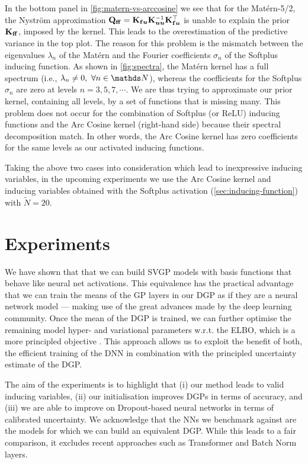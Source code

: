 In the bottom panel in \cref{fig:matern-vs-arccosine} we see that for the Mat\'ern-5/2, the Nystr\"om approximation $\mathbf{{Q}}_{\mathbf{f} \mathbf{f}} = \mathbf{{K}}_{\mathbf{f} \bm{u}} \mathbf{{K}}_{\bm{u} \bm{u}}^{-1} \mathbf{{K}}_{\mathbf{f} \bm{u}}^\top$ is unable to explain the prior $\Kff$, imposed by the kernel. This leads to the overestimation of the predictive variance in the top plot. The reason for this problem is the mismatch between the eigenvalues $\lambda_n$ of the Mat\'ern and the Fourier coefficients $\sigma_n$ of the Softplus inducing function. As shown in \cref{fig:spectra}, the Mat\'ern kernel has a full spectrum (i.e., $\lambda_n \neq 0,\ \forall n \in \Naturals$), whereas the coefficients for the Softplus $\sigma_n$ are zero at levels $n=3, 5, 7,\cdots$. We are thus trying to approximate our prior kernel, containing all levels, by a set of functions that is missing many. This problem does not occur for the combination of Softplus (or ReLU) inducing functions and the Arc Cosine kernel (right-hand side) because their spectral decomposition match. In other words, the Arc Cosine kernel has zero coefficients for the same levels as our activated inducing functions. 

Taking the above two cases into consideration which lead to inexpressive inducing variables, in the upcoming experiments we use the Arc Cosine kernel and inducing variables obtained with the Softplus activation (\cref{sec:inducing-function}) with $\tilde{N} = 20$.


\section{Experiments}
\label{section:dnn-for-dgps:experiments}

We have shown that that we can build SVGP models with basis functions that behave like neural net activations. This equivalence has the practical advantage that we can train the means of the GP layers in our DGP as if they are a neural network model --- making use of the great advances made by the deep learning community. Once the mean of the DGP is trained, we can further optimise the remaining model hyper- and variational parameters w.r.t. the ELBO, which is a more principled objective \citep{Fong2019On}. This approach allows us to exploit the benefit of both, the efficient training of the DNN in combination with the principled uncertainty estimate of the DGP. 

The aim of the experiments is to highlight that (i) our method leads to valid inducing variables, (ii) our initialisation improves DGPs in terms of accuracy, and (iii) we are able to improve on Dropout-based \citep{Gal2016dropout} neural networks in terms of calibrated uncertainty. 
We acknowledge that the NNs we benchmark against are the models for which we can build an equivalent DGP. While this leads to a fair comparison, it excludes recent approaches such as Transformer and Batch Norm layers.


